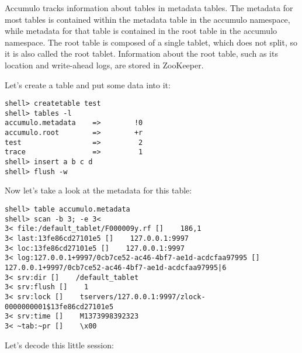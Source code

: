 Accumulo tracks information about tables in metadata tables. The metadata for
most tables is contained within the metadata table in the accumulo namespace,
while metadata for that table is contained in the root table in the accumulo
namespace. The root table is composed of a single tablet, which does not
split, so it is also called the root tablet. Information about the root
table, such as its location and write-ahead logs, are stored in ZooKeeper.

Let's create a table and put some data into it:

\small
\begin{verbatim}
shell> createtable test
shell> tables -l
accumulo.metadata    =>        !0
accumulo.root        =>        +r
test                 =>         2
trace                =>         1
shell> insert a b c d
shell> flush -w
\end{verbatim}
\normalsize

Now let's take a look at the metadata for this table:

\small
\begin{verbatim}
shell> table accumulo.metadata
shell> scan -b 3; -e 3<
3< file:/default_tablet/F000009y.rf []    186,1
3< last:13fe86cd27101e5 []    127.0.0.1:9997
3< loc:13fe86cd27101e5 []    127.0.0.1:9997
3< log:127.0.0.1+9997/0cb7ce52-ac46-4bf7-ae1d-acdcfaa97995 []    127.0.0.1+9997/0cb7ce52-ac46-4bf7-ae1d-acdcfaa97995|6
3< srv:dir []    /default_tablet
3< srv:flush []    1
3< srv:lock []    tservers/127.0.0.1:9997/zlock-0000000001$13fe86cd27101e5
3< srv:time []    M1373998392323
3< ~tab:~pr []    \x00
\end{verbatim}
\normalsize

Let's decode this little session:

